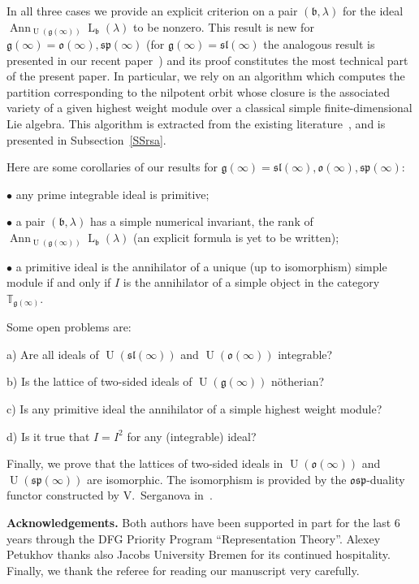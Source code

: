 \documentclass{emsprocart}
\begin{document}
In all three cases we provide an explicit criterion on a pair $(\mathfrak b, \lambda)$ for the ideal $\operatorname{Ann}_{\operatorname{U}(\mathfrak g(\infty))}\operatorname{L}_\mathfrak b(\lambda)$ to be nonzero. This result is new
for $\mathfrak g(\infty)=\mathfrak o(\infty), \mathfrak{sp}(\infty)$ (for $\mathfrak g(\infty)=\mathfrak{sl}(\infty)$ the analogous result is presented in our recent paper~\cite{PP2}) and its proof constitutes the most technical part of the present paper.
In particular, we rely on an algorithm which computes
the partition corresponding to the nilpotent orbit whose closure is the associated variety of a given highest weight module over a classical simple finite-dimensional Lie algebra.
This algorithm is extracted from the existing literature~\cite{Jo, Lusztig, Barbasch-Vogan}, and is presented in Subsection~\ref{SSrsa}.

Here are some corollaries of our results for $\mathfrak g(\infty)=\mathfrak{sl}(\infty), \mathfrak{o}(\infty), \mathfrak{sp}(\infty)$:

$\bullet$ any prime integrable ideal is primitive;

$\bullet$ a pair $(\mathfrak b, \lambda)$ has a simple numerical invariant, the rank of $\operatorname{Ann}_{\operatorname{U}(\mathfrak g(\infty))}\operatorname{L}_\mathfrak b(\lambda)$ (an explicit formula is yet to be written);

$\bullet$ a primitive ideal is the annihilator of a unique (up to isomorphism) simple module if and only if $I$ is the annihilator of a simple object in the category $\mathbb T_{\mathfrak g(\infty)}$.

Some open problems are:

a) Are all ideals of $\operatorname{U}(\mathfrak{sl}(\infty))$ and $\operatorname{U}(\mathfrak o(\infty))$ integrable?

b) Is the lattice of two-sided ideals of $\operatorname{U}(\mathfrak g(\infty))$ n\"otherian?

c) Is any primitive ideal the annihilator of a simple highest weight module?

d) Is it true that $I=I^2$ for any (integrable) ideal?

Finally, we prove that the lattices of two-sided ideals in $\operatorname{U}(\mathfrak o(\infty))$ and $\operatorname{U}(\mathfrak{sp}(\infty))$ are isomorphic. The isomorphism is provided by the $\mathfrak{osp}$-duality functor constructed by V.~Serganova in~\cite{S}.


{\bf Acknowledgements.} Both authors have been supported in part for the last 6 years through the DFG Priority Program ``Representation Theory''. Alexey Petukhov thanks also Jacobs University Bremen for its continued hospitality. Finally, we thank the referee for reading our manuscript very carefully.
\end{document}
